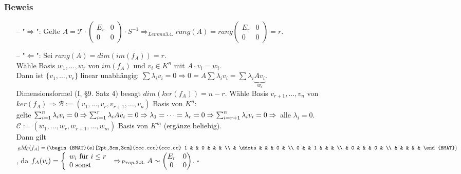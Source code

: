 \documentclass[a4paper,twoside]{article}
\newcommand{\tn}[1]{\textnormal {#1}}
\begin{document}
\subsubsection*{Beweis}
\begin{itemize}
	\item[--] "$\Rightarrow$": Gelte $A = \mathcal{T} \cdot \left(\begin{matrix}
		E_r & 0\\
		0 & 0
	\end{matrix}\right) \cdot S^{-1} \Rightarrow_{Lemma 3.4.} rang(A) = rang\left(\begin{matrix}
	E_r & 0 \\
	0 & 0
\end{matrix}\right) = r$.
\item[--] "$\Leftarrow$": Sei $rang(A) = dim(im(f_A)) = r$.\\ Wähle Basis $w_1, \dots, w_r$ von $im(f_A)$ und $v_i \in K^n$ mit $A \cdot v_i = w_i$.\\ Dann ist $\{v_1, \dots, v_r\}$ linear unabhängig: $\sum \lambda_i v_i = 0 \Rightarrow 0 = A\sum \lambda_i v_i = \sum \lambda_i \underbrace{Av_i}_{w_i}$.\\ Dimensionsformel (I, §9. Satz 4) besagt $dim(ker(f_A)) = n - r$. Wähle Basis $v_{r+1}, \dots, v_n$ von $ker(f_A) \Rightarrow \mathcal{B} := (v_1, \dots, v_r, v_{r+1}, \dots, v_n)$ Basis von $K^n$:\\ gelte $\sum_{i=1}^{n} \lambda_i v_i = 0 \Rightarrow \sum_{i=1}^r \lambda_i Av_i = 0 \Rightarrow \lambda_1 = \dots = \lambda_r = 0 \Rightarrow \sum_{i=r+1}^n \lambda_i v_i = 0\\ \Rightarrow$ alle $\lambda_i = 0$.\\
$\mathcal{C} := (w_1, \dots, w_r, w_{r+1}, \dots, w_m)$ Basis von $K^m$ (ergänze beliebig).\\
Dann gilt ${_\mathcal B}M_\mathcal{C}(f_A) = \left(
\begin{BMAT}(e)[2pt,3cm,3cm]{ccc.ccc}{ccc.cc}
	1 & & 0 & & & \\
	& \ddots & & & 0 & \\
	0 & & 1 & & & \\
	& 0 & & & 0 & \\
	& & & & & 
\end{BMAT}
\right)$, da $f_A(v_i) = \left \{\begin{array}{ll}
	w_i \tn{ für } i \leq r\\
	0 \tn{ sonst}
\end{array}\right.\\ \Rightarrow_{Prop. 3.3.} A \sim \left( \begin{matrix}
E_r & 0\\
0&0
\end{matrix}\right)$. $\square$
\end{itemize}
\end{document}
